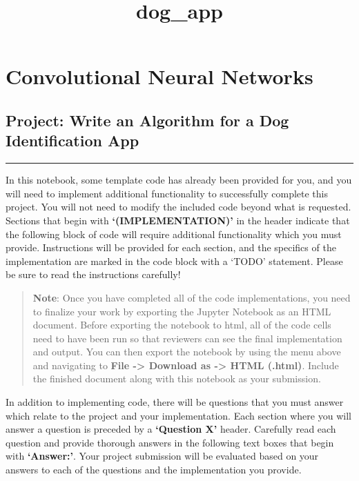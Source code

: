 \documentclass[11pt]{article}
\title{dog\_app}
\begin{document}
    
    
    \maketitle
    
    

    
    \hypertarget{convolutional-neural-networks}{%
\section{Convolutional Neural
Networks}\label{convolutional-neural-networks}}

\hypertarget{project-write-an-algorithm-for-a-dog-identification-app}{%
\subsection{Project: Write an Algorithm for a Dog Identification
App}\label{project-write-an-algorithm-for-a-dog-identification-app}}

\begin{center}\rule{0.5\linewidth}{\linethickness}\end{center}

In this notebook, some template code has already been provided for you,
and you will need to implement additional functionality to successfully
complete this project. You will not need to modify the included code
beyond what is requested. Sections that begin with
\textbf{`(IMPLEMENTATION)'} in the header indicate that the following
block of code will require additional functionality which you must
provide. Instructions will be provided for each section, and the
specifics of the implementation are marked in the code block with a
`TODO' statement. Please be sure to read the instructions carefully!

\begin{quote}
\textbf{Note}: Once you have completed all of the code implementations,
you need to finalize your work by exporting the Jupyter Notebook as an
HTML document. Before exporting the notebook to html, all of the code
cells need to have been run so that reviewers can see the final
implementation and output. You can then export the notebook by using the
menu above and navigating to \textbf{File -\textgreater{} Download as
-\textgreater{} HTML (.html)}. Include the finished document along with
this notebook as your submission.
\end{quote}

In addition to implementing code, there will be questions that you must
answer which relate to the project and your implementation. Each section
where you will answer a question is preceded by a \textbf{`Question X'}
header. Carefully read each question and provide thorough answers in the
following text boxes that begin with \textbf{`Answer:'}. Your project
submission will be evaluated based on your answers to each of the
questions and the implementation you provide.
\end{document}
